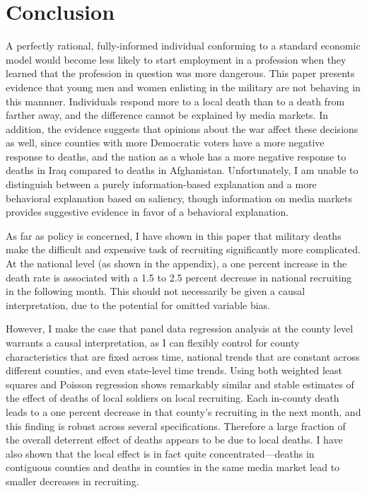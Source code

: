 \documentclass[12pt] {article}
\begin{document}
\section{Conclusion}\label{sec:Conclusion}


A perfectly rational, fully-informed individual conforming to a standard economic model would become less likely to start employment in a profession when they learned that the profession in question was more dangerous. This paper presents evidence that young men and women enlisting in the military are not behaving in this mannner. Individuals respond more to a local death than to a death from farther away, and the difference cannot be explained by media markets. In addition, the evidence suggests that opinions about the war affect these decisions as well, since counties with more Democratic voters have a more negative response to deaths, and the nation as a whole has a more negative response to deaths in Iraq compared to deaths in Afghanistan. Unfortunately, I am unable to distinguish between a purely information-based explanation and a more behavioral explanation based on saliency, though information on media markets provides suggestive evidence in favor of a behavioral explanation.

As far as policy is concerned, I have shown in this paper that military deaths make the difficult and expensive task of recruiting significantly
more complicated. At the national level (as shown in the appendix), a one percent increase in the death rate is associated with a 1.5 to 2.5 percent decrease in
national recruiting in the following month. This should not necessarily
be given a causal interpretation, due to the potential for omitted
variable bias. 

However, I make the case that panel data regression
analysis at the county level warrants a causal interpretation, as
I can flexibly control for county characteristics that are fixed across
time, national trends that are constant across different counties,
and even state-level time trends. Using both weighted least squares
and Poisson regression shows remarkably similar and stable estimates
of the effect of deaths of local soldiers on local recruiting. Each
in-county death leads to a one percent decrease in that county's recruiting
in the next month, and this finding is robust across several specifications.
Therefore a large fraction of the overall deterrent effect of deaths appears
to be due to local deaths. I have also shown that the local effect
is in fact quite concentrated---deaths in contiguous counties and
deaths in counties in the same media market lead to smaller decreases in recruiting.
\end{document}
